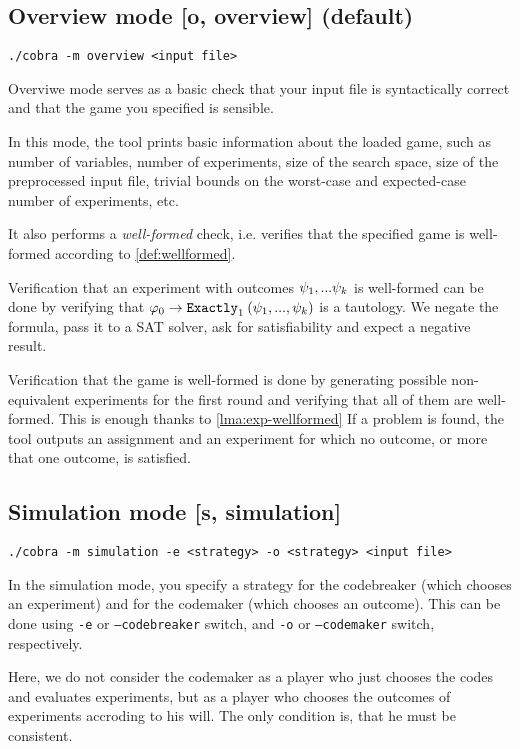 \subsection{Overview mode [o, overview] (default)}

\centerline{\texttt{./cobra -m overview <input file> }}
\medskip

Overviwe mode serves as a basic check that your input file is
  syntactically correct and that the game you specified is sensible.

In this mode, the tool prints basic information about the loaded game, such as
  number of variables, number of experiments, size of the search space,
  size of the preprocessed input file,
  trivial bounds on the worst-case and expected-case number of experiments, etc.

It also performs a \emph{well-formed} check, i.e. verifies that the
  specified game is well-formed according to \autoref{def:wellformed}.

Verification that an experiment with outcomes $\psi_1,...\psi_k$ is well-formed
  can be done by verifying that $\varphi_0->\mathtt{Exactly}_{1}\:(\psi_1, ..., \psi_k)$
  is a tautology.
We negate the formula, pass it to a SAT solver, ask for satisfiability and expect a negative result.

Verification that the game is well-formed is done by
  generating possible non-equivalent experiments for the first round
  and verifying that all of them are well-formed.
This is enough thanks to \autoref{lma:exp-wellformed}
If a problem is found, the tool outputs an assignment and an experiment
  for which no outcome, or more that one outcome, is satisfied.

\subsection{Simulation mode [s, simulation]}

\centerline{\texttt{./cobra -m simulation -e <strategy> -o <strategy> <input file> }}

In the simulation mode, you specify a strategy for
  the codebreaker (which chooses an experiment) and for the codemaker
   (which chooses an outcome).
This can be done using \texttt{-e} or \texttt{--codebreaker} switch, and
\texttt{-o} or \texttt{--codemaker} switch, respectively.

Here, we do not consider the codemaker as a player who just chooses the codes
and evaluates experiments, but as a player who chooses the outcomes
of experiments accroding to his will.
The only condition is, that he must be consistent.

